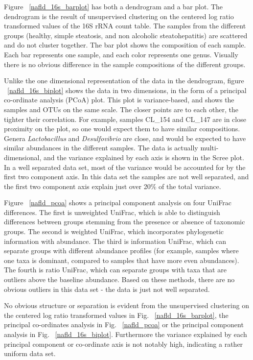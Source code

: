 Figure ~\ref{nafld_16s_barplot} has both a dendrogram and a bar plot. The dendrogram is the result of unsupervised clustering on the centered log ratio transformed values of the 16S rRNA count table. The samples from the different groups (healthy, simple steatosis, and non alcoholic steatohepatitis) are scattered and do not cluster together. The bar plot shows the composition of each sample. Each bar represents one sample, and each color represents one genus. Visually there is no obvious difference in the sample compositions of the different groups.

Unlike the one dimensional representation of the data in the dendrogram, figure ~\ref{nafld_16s_biplot} shows the data in two dimensions, in the form of a principal co-ordinate analysis (PCoA) plot. This plot is variance-based, and shows the samples and OTUs on the same scale. The closer points are to each other, the tighter their correlation. For example, samples CL\_154 and CL\_147 are in close proximity on the plot, so one would expect them to have similar compositions. Genera \textit{Lactobacillus} and \textit{Desulfovibrio} are close, and would be expected to have similar abundances in the different samples. The data is actually multi-dimensional, and the variance explained by each axis is shown in the Scree plot. In a well separated data set, most of the variance would be accounted for by the first two component axis. In this data set the samples are not well separated, and the first two component axis explain just over 20\% of the total variance.

Figure ~\ref{nafld_pcoa} shows a principal component analysis on four UniFrac differences. The first is unweighted UniFrac, which is able to distinguish differences between groups stemming from the presence or absence of taxonomic groups. The second is weighted UniFrac, which incorporates phylogenetic information with abundance. The third is information UniFrac, which can separate groups with different abundance profiles (for example, samples where one taxa is dominant, compared to samples that have more even abundances). The fourth is ratio UniFrac, which can separate groups with taxa that are outliers above the baseline abundance. Based on these methods, there are no obvious outliers in this data set - the data is just not well separated.

No obvious structure or separation is evident from the unsupervised clustering on the centered log ratio transformed values in Fig. ~\ref{nafld_16s_barplot}, the principal co-ordinates analysis in Fig. ~\ref{nafld_pcoa} or the principal component analysis in Fig. ~\ref{nafld_16s_biplot}. Furthermore the variance explained by each principal component or co-ordinate axis is not notably high, indicating a rather uniform data set.

